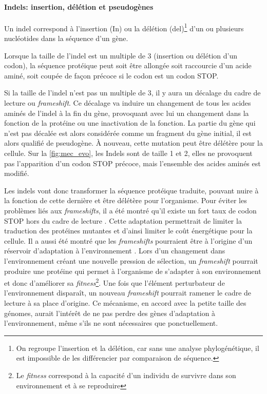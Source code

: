 \paragraph{Indels: insertion, délétion et pseudogènes}

Un indel correspond à l'insertion (In) ou la délétion (del)\footnote{On regroupe l'insertion et la délétion, car sans une analyse phylogénétique, il est impossible de les différencier par comparaison de séquence.} d'un ou plusieurs nucléotides dans la séquence d'un gène. 

Lorsque la taille de l'indel est un multiple de 3 (insertion ou délétion d'un codon), la séquence protéique peut soit être allongée soit raccourcie d'un acide aminé, soit coupée de façon précoce si le codon est un codon STOP.

Si la taille de l'indel n'est pas un multiple de 3, il y aura un décalage du cadre de lecture ou \textit{frameshift}. Ce décalage va induire un changement de tous les acides aminés de l'indel à la fin du gène, provoquant avec lui un changement dans la fonction de la protéine ou une inactivation de la fonction. La partie du gène qui n'est pas décalée est alors considérée comme un fragment du gène initial, il est alors qualifié de pseudogène. À nouveau, cette mutation peut être délétère pour la cellule. Sur la \autoref{fig:mec_evo}, les Indels sont de taille 1 et 2, elles ne provoquent pas l'apparition d'un codon STOP précoce, mais l'ensemble des acides aminés est modifié.

Les indels vont donc transformer la séquence protéique traduite, pouvant nuire à la fonction de cette dernière et être délétère pour l'organisme. Pour éviter les problèmes liés aux \textit{frameshifts}, il a été montré qu'il existe un fort taux de codon STOP hors du cadre de lecture \cite{tse_natural_2010}. Cette adaptation permettrait de limiter la traduction des protéines mutantes et d'ainsi limiter le coût énergétique pour la cellule. Il a aussi été montré que les \textit{frameshifts} pourraient être à l'origine d'un réservoir d'adaptation à l'environnement \cite{koch_catastrophe_2004}. Lors d'un changement dans l'environnement créant une nouvelle pression de sélection, un \textit{frameshift} pourrait produire une protéine qui permet à l'organisme de s'adapter à son environnement et donc d'améliorer sa \textit{fitness}\footnote{Le \textit{fitness} correspond à la capacité d'un individu de survivre dans son environnement et à se reproduire}. Une fois que l'élément perturbateur de l'environnement disparaît, un nouveau \textit{frameshift} pourrait ramener le cadre de lecture à sa place d'origine. Ce mécanisme, en accord avec la petite taille des génomes, aurait l'intérêt de ne pas perdre des gènes d'adaptation à l'environnement, même s'ils ne sont nécessaires que ponctuellement.


